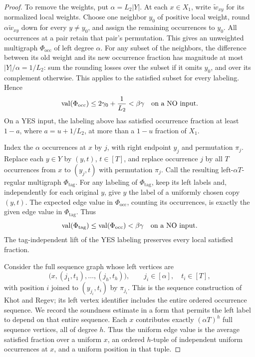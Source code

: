 \begin{proof}
To remove the weights, put \(\alpha=L_2|Y|\).  At each \(x\in X_1\),
write \(\widetilde w_{xy}\) for its normalized local weights.
Choose one neighbor \(y_0\) of positive local weight, round
\(\alpha\widetilde w_{xy}\) down for every \(y\ne y_0\), and assign the remaining
occurrences to \(y_0\).  All occurrences at a pair retain that pair's
permutation.  This gives an unweighted multigraph
\(\Phi_{\mathrm{occ}}\) of left degree \(\alpha\).  For any subset of
the neighbors, the difference between
its old weight and its new occurrence fraction has magnitude at most
\(|Y|/\alpha=1/L_2\): sum the rounding losses over the subset if it
omits \(y_0\), and over its complement otherwise.  This applies to the
satisfied subset for every labeling.  Hence
\begin{equation}
 \operatorname{val}(\Phi_{\mathrm{occ}})\le 2\gamma_0+\frac1{L_2}<\beta\gamma
 \quad\text{on a NO input}.
\label{eq:strong-left-base-soundness}
\end{equation}
On a YES input, the labeling above has satisfied occurrence fraction
at least \(1-a\), where \(a=u+1/L_2\), at more than a \(1-u\) fraction
of \(X_1\).

Index the \(\alpha\) occurrences at \(x\) by \(j\), with right endpoint
\(y_j\) and permutation \(\pi_j\).  Replace each \(y\in Y\) by
\((y,t)\), \(t\in[T]\), and replace occurrence \(j\) by all \(T\)
occurrences from \(x\) to \((y_j,t)\) with permutation \(\pi_j\).
Call the resulting left-\(\alpha T\)-regular multigraph
\(\Phi_{\mathrm{tag}}\).  For any labeling of \(\Phi_{\mathrm{tag}}\),
keep its left labels and, independently for each original \(y\), give
\(y\) the label of a uniformly chosen copy \((y,t)\).  The expected
edge value in \(\Phi_{\mathrm{occ}}\), counting its occurrences, is
exactly the given edge value in \(\Phi_{\mathrm{tag}}\).  Thus
\begin{equation}
 \operatorname{val}(\Phi_{\mathrm{tag}})\le\operatorname{val}(\Phi_{\mathrm{occ}})<\beta\gamma
 \quad\text{on a NO input}.
\label{eq:strong-left-tag-value}
\end{equation}
The tag-independent lift of the YES labeling preserves every local
satisfied fraction.

Consider the full sequence graph whose left vertices are
\[
 \bigl(x,(j_1,t_1),\ldots,(j_h,t_h)\bigr),
 \qquad j_i\in[\alpha],\quad t_i\in[T],
\]
with position \(i\) joined to \((y_{j_i},t_i)\) by \(\pi_{j_i}\).
This is the sequence construction of Khot and Regev; its left vertex
identifier includes the entire ordered occurrence sequence.  We record
the soundness estimate in a form that permits the left label to depend
on that entire sequence.
Each \(x\) contributes exactly \((\alpha T)^h\) full sequence vertices,
all of degree \(h\).  Thus the uniform edge value is the average satisfied
fraction over a uniform \(x\), an ordered \(h\)-tuple of independent
uniform occurrences at \(x\), and a uniform position in that tuple.


\end{proof}
